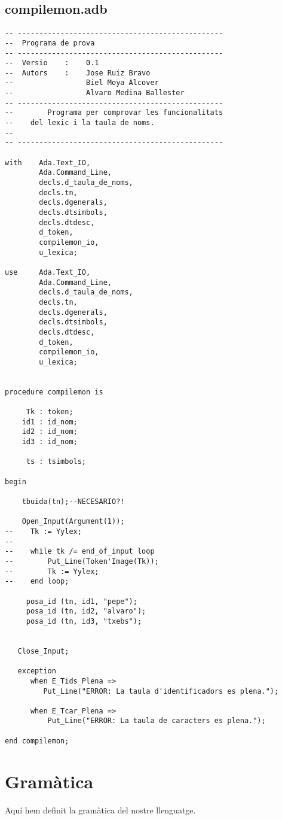 \documentclass[10pt]{report}
\begin{document}
    \section{compilemon.adb}
    \begin{lstlisting}[style=Ada]
-- ------------------------------------------------
--  Programa de prova
-- ------------------------------------------------
--  Versio    :    0.1
--  Autors    :    Jose Ruiz Bravo
--                 Biel Moya Alcover
--                 Alvaro Medina Ballester
-- ------------------------------------------------
--        Programa per comprovar les funcionalitats
--    del lexic i la taula de noms.
--
-- ------------------------------------------------

with    Ada.Text_IO,
        Ada.Command_Line,
        decls.d_taula_de_noms,
        decls.tn,
        decls.dgenerals,
        decls.dtsimbols,
        decls.dtdesc,
        d_token,
        compilemon_io,
        u_lexica;
        
use     Ada.Text_IO,
        Ada.Command_Line,
        decls.d_taula_de_noms,
        decls.tn,
        decls.dgenerals,
        decls.dtsimbols,
        decls.dtdesc,
        d_token,
        compilemon_io,
        u_lexica;
        

procedure compilemon is

     Tk : token;
    id1 : id_nom;
    id2 : id_nom;
    id3 : id_nom;
    
     ts : tsimbols;
    
begin

    tbuida(tn);--NECESARIO?!

    Open_Input(Argument(1));
--    Tk := Yylex;
--    
--    while tk /= end_of_input loop
--        Put_Line(Token'Image(Tk));
--        Tk := Yylex;
--    end loop;

     posa_id (tn, id1, "pepe");
     posa_id (tn, id2, "alvaro");
     posa_id (tn, id3, "txebs");
     
   
   Close_Input;
   
   exception
      when E_Tids_Plena => 
         Put_Line("ERROR: La taula d'identificadors es plena.");
         
      when E_Tcar_Plena =>
          Put_Line("ERROR: La taula de caracters es plena.");

end compilemon;
    \end{lstlisting}
    \newpage
    
    
    \chapter{Gramàtica}
        Aquí hem definit la gramàtica del nostre llenguatge.
    \\
    \\
    
\end{document}

